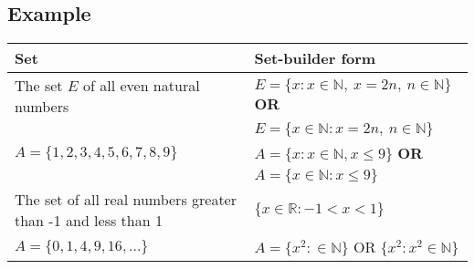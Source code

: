 \documentclass[./main.tex]{subfiles}
\begin{document}
\subsection*{Example}

\begin{table}[h]
    \begin{center}
        \begin{tabular}{ |p{6cm}|p{8cm}| }
            \rowcolor{cyan!30}
            \hline
            Set 									& Set-builder form \\ \hline
            The set $E$ of all even natural numbers	& $E = \{ x: x \in \mathbb{N},\ x = 2n,\ n \in \mathbb{N} \}$ {\tiny\textbf{OR}} \\
                         			        		& $E = \{ x \in \mathbb{N}:  x = 2n,\ n \in \mathbb{N} \}$ \\ \hline
            $A = \{ 1, 2, 3, 4, 5, 6, 7, 8 , 9 \}$  & $A = \{ x: x \in \mathbb{N}, x \leq 9 \}$ {\tiny\textbf{OR}} \\
                                                    & $A = \{ x \in \mathbb{N}: x \leq 9 \}$ \\ \hline
            The set of all real numbers greater than -1 and less than 1 & $\{ x \in \mathbb{R}: -1 < x < 1  \}$ \\ \hline
            $A = \{ 0, 1, 4, 9, 16, ... \} $		& $A = \{ x^2:\in \mathbb{N} \}$ OR $\{ x^2: x^2 \in \mathbb{N} \}$ \\ \hline

        \end{tabular}
    \end{center}
\end{table}
\end{document}
